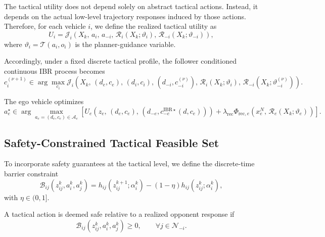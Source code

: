 \documentclass[final ,3p, times]{elsarticle}
\begin{document}
The tactical utility does not depend solely on abstract tactical actions. Instead, it depends on the actual low-level trajectory responses induced by those actions. Therefore, for each vehicle $i$, we define the realized tactical utility as
\begin{equation}
U_i
=
\mathcal{J}_i\!\left(
X_k,\,
a_i,\,
a_{-i},\,
\mathcal{R}_i(X_k;\vartheta_i),\,
\mathcal{R}_{-i}(X_k;\vartheta_{-i})
\right),
\label{eq:realized_utility}
\end{equation}
where $\vartheta_i=\mathcal{T}(a_i,o_i)$ is the planner-guidance variable.

Accordingly, under a fixed discrete tactical profile, the follower conditioned continuous IBR process becomes
\begin{equation}
c_i^{(\nu+1)}
\in
\arg\max_{c_i}
\mathcal{J}_i\!\left(
X_k,\,
(d_e,c_e),\,
(d_i,c_i),\,
(d_{-i},c_{-i}^{(\nu)}),\,
\mathcal{R}_i(X_k;\vartheta_i),\,
\mathcal{R}_{-i}(X_k;\vartheta_{-i}^{(\nu)})
\right).
\label{eq:ibr_with_lower_response}
\end{equation}


The ego vehicle optimizes
\begin{equation}
a_e^\star
\in
\arg\max_{a_e=(d_e,c_e)\in\mathcal{A}_e}
\left[
U_e\!\left(
z_e,\,
(d_e,c_e),\,
(d_{-e},c_{-e}^{\mathrm{IBR}\star}(d,c_e))
\right)
+
\lambda_{\mathrm{rec}}
\Phi_{\mathrm{rec},e}
\left(
x_e^N,\,
\mathcal{R}_e(X_k;\vartheta_e)
\right)
\right].
\label{eq:complete_bilevel_game}
\end{equation}


\subsection{Safety-Constrained Tactical Feasible Set}
\label{subsec:safety_feasible_set}

To incorporate safety guarantees at the tactical level, we define the discrete-time barrier constraint
\begin{equation}
\mathcal{B}_{ij}(z_{ij}^k,a_i^k,a_j^k)
=
h_{ij}(z_{ij}^{k+1};\alpha_i^k)
-
(1-\eta)
h_{ij}(z_{ij}^{k};\alpha_i^k),
\label{eq:barrier_constraint}
\end{equation}
with $\eta\in(0,1]$.

A tactical action is deemed safe relative to a realized opponent response if
\begin{equation}
\mathcal{B}_{ij}(z_{ij}^k,a_i^k,a_j^k)\ge 0,
\qquad
\forall j\in\mathcal{N}_{-i}.
\label{eq:safe_tactical_constraint}
\end{equation}
\end{document}
